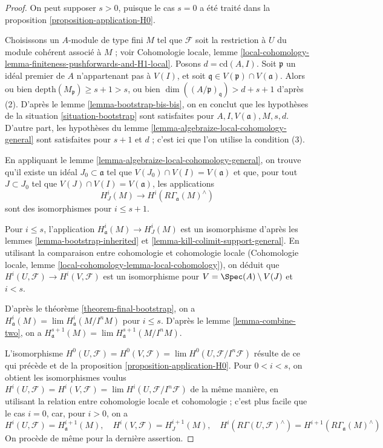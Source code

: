 \begin{proof}
On peut supposer $s > 0$, puisque le cas $s = 0$ a été traité dans la
proposition \ref{proposition-application-H0}.

\medskip\noindent
Choisissons un $A$-module de type fini $M$ tel que $\mathcal{F}$ soit la restriction
à $U$ du module cohérent associé à $M$ ; voir Cohomologie locale,
lemme \ref{local-cohomology-lemma-finiteness-pushforwards-and-H1-local}.
Posons $d = \text{cd}(A, I)$.
Soit $\mathfrak p$ un idéal premier de $A$ n'appartenant pas à $V(I)$,
et soit $\mathfrak q \in V(\mathfrak p) \cap V(\mathfrak a)$.
Alors ou bien $\text{depth}(M_\mathfrak p) \geq s + 1 > s$,
ou bien $\dim((A/\mathfrak p)_\mathfrak q) > d + s + 1$ d'après (2).
D'après le lemme \ref{lemma-bootstrap-bis-bis}, on en conclut que les
hypothèses de la situation \ref{situation-bootstrap}
sont satisfaites pour $A, I, V(\mathfrak a), M, s, d$.
D'autre part, les hypothèses du
lemme \ref{lemma-algebraize-local-cohomology-general}
sont satisfaites pour $s + 1$ et $d$ ; c'est ici que l'on utilise la condition (3).

\medskip\noindent
En appliquant le lemme \ref{lemma-algebraize-local-cohomology-general},
on trouve qu'il existe un idéal
$J_0 \subset \mathfrak a$ tel que $V(J_0) \cap V(I) = V(\mathfrak a)$
et que, pour tout $J \subset J_0$ tel que $V(J) \cap V(I) = V(\mathfrak a)$,
les applications
$$
H^i_J(M) \longrightarrow H^i(R\Gamma_\mathfrak a(M)^\wedge)
$$
sont des isomorphismes pour $i \leq s + 1$.

\medskip\noindent
Pour $i \leq s$, l'application $H^i_\mathfrak a(M) \to H^i_J(M)$
est un isomorphisme d'après les lemmes \ref{lemma-bootstrap-inherited} et
\ref{lemma-kill-colimit-support-general}.
En utilisant la comparaison entre cohomologie et cohomologie locale
(Cohomologie locale, lemme \ref{local-cohomology-lemma-local-cohomology}),
on déduit que
$H^i(U, \mathcal{F}) \to H^i(V,\mathcal{F})$
est un isomorphisme pour $V = \Spec(A) \setminus V(J)$ et
$i < s$.

\medskip\noindent
D'après le théorème \ref{theorem-final-bootstrap}, on a
$H^i_\mathfrak a(M) = \lim H^i_\mathfrak a(M/I^nM)$
pour $i \leq s$. D'après le lemme \ref{lemma-combine-two}, on a
$H^{s + 1}_\mathfrak a(M) = \lim H^{s + 1}_\mathfrak a(M/I^nM)$.

\medskip\noindent
L'isomorphisme $H^0(U, \mathcal{F}) = H^0(V, \mathcal{F}) =
\lim H^0(U, \mathcal{F}/I^n\mathcal{F})$ résulte de ce qui précède et de la
proposition \ref{proposition-application-H0}.
Pour $0 < i < s$, on obtient les isomorphismes voulus
$H^i(U, \mathcal{F}) = H^i(V, \mathcal{F}) =
\lim H^i(U, \mathcal{F}/I^n\mathcal{F})$ de la
même manière, en utilisant la relation entre cohomologie locale
et cohomologie ; c'est plus facile que le cas $i = 0$,
car, pour $i > 0$, on a
$$
H^i(U, \mathcal{F}) = H^{i + 1}_\mathfrak a(M),
\quad
H^i(V, \mathcal{F}) = H^{i + 1}_J(M),
\quad
H^i(R\Gamma(U, \mathcal{F})^\wedge) = 
H^{i + 1}(R\Gamma_\mathfrak a(M)^\wedge)
$$
On procède de même pour la dernière assertion.
\end{proof}

